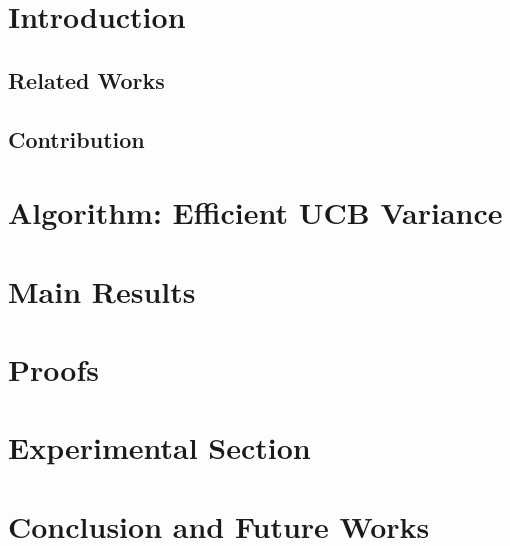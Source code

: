 \documentclass{llncs}
\begin{document}
\section{Introduction}
\label{sec:intro}


\subsection{Related Works}
\label{sec:related}



\subsection{Contribution}
\label{sec:contri}


\section{Algorithm: Efficient UCB Variance}
\label{sec:eucbv}


\section{Main Results}
\label{sec:results}


\section{Proofs}
\label{sec:proofTheorem}


\section{Experimental Section}
\label{sec:expt}


\section{Conclusion and Future Works}
\label{sec:conc}



\clearpage
\newpage



\end{document}
